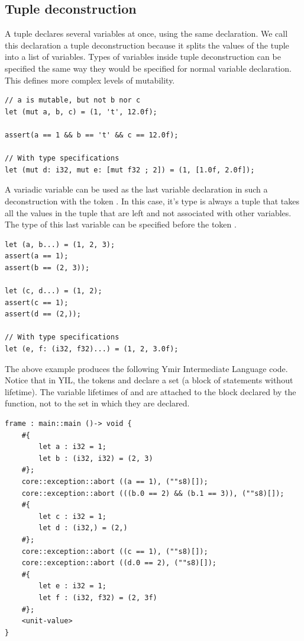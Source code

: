 \subsection{Tuple deconstruction}

A tuple declares several variables at once, using the same
 declaration. We call this declaration a tuple deconstruction
because it splits the values of the tuple into a list of variables. Types of
variables inside tuple deconstruction can be specified the same way they would
be specified for normal variable declaration. This defines more
complex levels of mutability.

\begin{lstlisting}[style=coloredverbatim]
  // a is mutable, but not b nor c
let (mut a, b, c) = (1, 't', 12.0f);

assert(a == 1 && b == 't' && c == 12.0f);

// With type specifications
let (mut d: i32, mut e: [mut f32 ; 2]) = (1, [1.0f, 2.0f]);
\end{lstlisting}

A variadic variable can be used as the last variable declaration in such a
deconstruction with the token . In this case, it's type is always a
tuple that takes all the values in the tuple that are left and not associated
with other variables. The type of this last variable can be specified before the
token .

\begin{lstlisting}[style=coloredverbatim]
let (a, b...) = (1, 2, 3);
assert(a == 1);
assert(b == (2, 3));

let (c, d...) = (1, 2);
assert(c == 1);
assert(d == (2,));

// With type specifications
let (e, f: (i32, f32)...) = (1, 2, 3.0f);
\end{lstlisting}

The above example produces the following Ymir Intermediate Language code. Notice
that in YIL, the tokens \tokennolst{\#\{} and \tokennolst{\#\}} declare a
set (a block of statements without lifetime). The variable lifetimes of 
and  are attached to the block declared by the function, not to the
set in which they are declared.

\begin{lstlisting}[style=myilVerb]
frame : main::main ()-> void {
    #{
        let a : i32 = 1;
        let b : (i32, i32) = (2, 3)
    #};
    core::exception::abort ((a == 1), (""s8)[]);
    core::exception::abort (((b.0 == 2) && (b.1 == 3)), (""s8)[]);
    #{
        let c : i32 = 1;
        let d : (i32,) = (2,)
    #};
    core::exception::abort ((c == 1), (""s8)[]);
    core::exception::abort ((d.0 == 2), (""s8)[]);
    #{
        let e : i32 = 1;
        let f : (i32, f32) = (2, 3f)
    #};
    <unit-value>
}
\end{lstlisting}

